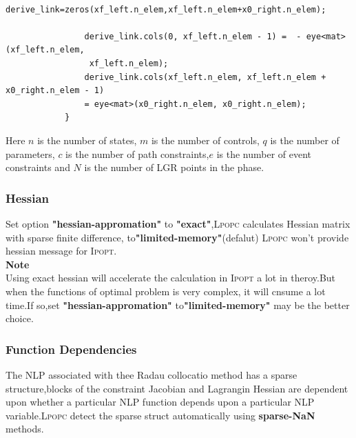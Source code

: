 \documentclass[10pt]{article}
\newcommand{\Ipopt}{\textsc{Ipopt}\xspace}
\newcommand{\LPOPC}{\textsc{Lpopc}\xspace}
\begin{document}
\begin{itemize}
\begin{frame}
\begin{lstlisting}
				derive_link=zeros(xf_left.n_elem,xf_left.n_elem+x0_right.n_elem);
				
				derive_link.cols(0, xf_left.n_elem - 1) =  - eye<mat>(xf_left.n_elem,
				 xf_left.n_elem);
				derive_link.cols(xf_left.n_elem, xf_left.n_elem + x0_right.n_elem - 1)
				= eye<mat>(x0_right.n_elem, x0_right.n_elem);
			}
		\end{lstlisting}
	    
	\end{frame}
    \end{itemize}
    Here $n$ is the number of states, $m$ is the number of controls, $q$
    is the number of parameters, $c$ is the number of path constraints,$e$ is the number of event constraints and $N$ is the number of LGR points in the
    phase.
	\subsubsection{Hessian}
	Set option 	\textbf{"hessian-appromation"} to \textbf{"exact"},\LPOPC calculates
	Hessian matrix with sparse finite difference\cite{Patterson2014}, to\textbf{"limited-memory"}(defalut) \LPOPC won't provide hessian message for \Ipopt.\\
	\textbf{Note}\\
	Using exact hessian will accelerate the calculation in \Ipopt a lot in theroy.But when the functions of optimal problem is very complex, it will cnsume a lot time.If so,set
	\textbf{"hessian-appromation"} to\textbf{"limited-memory"} may be the better choice.
	\subsubsection{Function Dependencies}
	The NLP associated  with thee Radau collocatio method has a sparse structure,blocks of the constraint Jacobian and Lagrangin Hessian are dependent  upon whether a particular NLP function depends upon a particular NLP variable\cite{Patterson2012}.\LPOPC detect the sparse struct automatically using \textbf{sparse-NaN} methods\cite{Patterson2014}.
\end{document}
